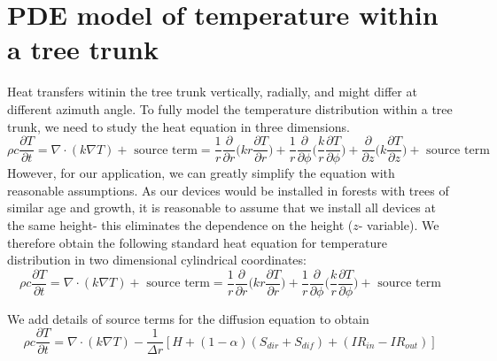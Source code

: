 \documentclass[12pt]{article}
\begin{document}
\section{PDE model of temperature within a tree trunk}
Heat transfers witinin the tree trunk vertically, radially, and might differ at different azimuth angle. To fully model the temperature distribution within a tree trunk, we need to study the heat equation in three dimensions. 
\begin{equation}
\rho c \frac{\partial T}{\partial t}=\nabla\cdot(k\nabla T)+\text{ source term}=\frac{1}{r}\frac{\partial}{\partial r}\bigg(kr\frac{\partial T}{\partial r}\bigg)+\frac{1}{r}\frac{\partial}{\partial \phi}\bigg(\frac{k}{r}\frac{\partial T}{\partial \phi}\bigg)+\frac{\partial}{\partial z}\bigg(k\frac{\partial T}{\partial z}\bigg)+\text{ source term}\label{heat3d}
\end{equation}
However, for our application, we can greatly simplify the equation with reasonable assumptions. As our devices would be installed in forests with trees of similar age and growth, it is reasonable to assume that we install all devices at the same height- this eliminates the dependence on the height ($z$- variable). We therefore obtain the following standard heat equation for temperature distribution in two dimensional cylindrical coordinates:
\begin{equation}
\rho c\frac{\partial T}{\partial t}=\nabla\cdot(k\nabla T)+\text{ source term}=\frac{1}{r}\frac{\partial}{\partial r}\bigg(kr\frac{\partial T}{\partial r}\bigg)+\frac{1}{r}\frac{\partial}{\partial \phi}\bigg(\frac{k}{r}\frac{\partial T}{\partial \phi}\bigg)+\text{ source term}\label{heat2d}
\end{equation}

We add details of source terms for the diffusion equation to obtain
\begin{equation}
\rho c\frac{\partial T}{\partial t}=\nabla\cdot(k\nabla T)-\frac{1}{\Delta r}[H+(1-\alpha)(S_{dir}+S_{dif})+(IR_{in}-IR_{out})]
\end{equation}
\end{document}
